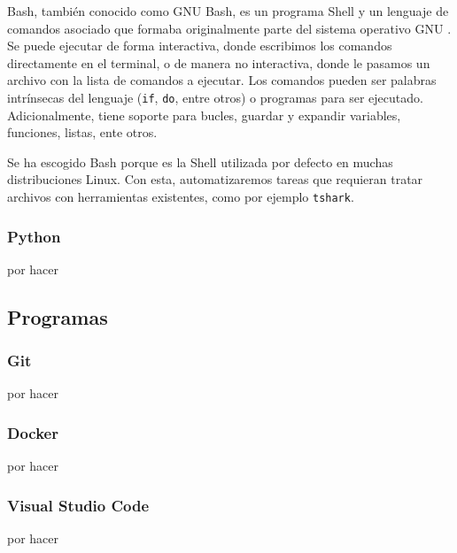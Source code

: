 \color{blue} %

Bash, también conocido como GNU Bash, es un programa Shell y un lenguaje de comandos asociado que formaba originalmente parte del sistema operativo GNU \cite{gnubashweb} \cite{gnubashmanual}. Se puede ejecutar de forma interactiva, donde escribimos los comandos directamente en el terminal, o de manera no interactiva, donde le pasamos un archivo con la lista de comandos a ejecutar. Los comandos pueden ser palabras intrínsecas del lenguaje (\texttt{if}, \texttt{do}, entre otros) o programas para ser ejecutado. Adicionalmente, tiene soporte para bucles, guardar y expandir variables, funciones, listas, ente otros.

Se ha escogido Bash porque es la Shell utilizada por defecto en muchas distribuciones Linux. Con esta, automatizaremos tareas que requieran tratar archivos con herramientas existentes, como por ejemplo \texttt{tshark}.

\subsubsection{Python}

por hacer

\subsection{Programas}

\subsubsection{Git}

por hacer

\subsubsection{Docker}

por hacer

\subsubsection{Visual Studio Code}

por hacer
